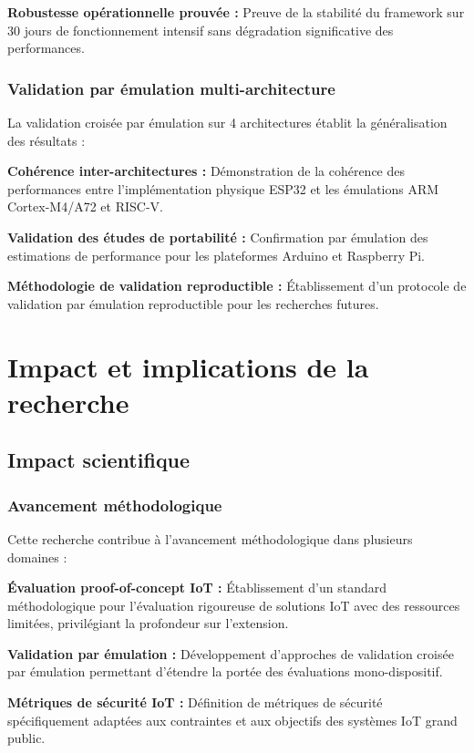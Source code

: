 \textbf{Robustesse opérationnelle prouvée :} Preuve de la stabilité du framework sur 30 jours de fonctionnement intensif sans dégradation significative des performances.

\subsubsection{Validation par émulation multi-architecture}

La validation croisée par émulation sur 4 architectures établit la généralisation des résultats :

\textbf{Cohérence inter-architectures :} Démonstration de la cohérence des performances entre l'implémentation physique ESP32 et les émulations ARM Cortex-M4/A72 et RISC-V.

\textbf{Validation des études de portabilité :} Confirmation par émulation des estimations de performance pour les plateformes Arduino et Raspberry Pi.

\textbf{Méthodologie de validation reproductible :} Établissement d'un protocole de validation par émulation reproductible pour les recherches futures.

\section{Impact et implications de la recherche}

\subsection{Impact scientifique}

\subsubsection{Avancement méthodologique}

Cette recherche contribue à l'avancement méthodologique dans plusieurs domaines :

\textbf{Évaluation proof-of-concept IoT :} Établissement d'un standard méthodologique pour l'évaluation rigoureuse de solutions IoT avec des ressources limitées, privilégiant la profondeur sur l'extension.

\textbf{Validation par émulation :} Développement d'approches de validation croisée par émulation permettant d'étendre la portée des évaluations mono-dispositif.

\textbf{Métriques de sécurité IoT :} Définition de métriques de sécurité spécifiquement adaptées aux contraintes et aux objectifs des systèmes IoT grand public.

